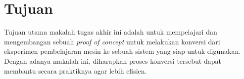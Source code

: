\section{Tujuan}

Tujuan utama makalah tugas akhir ini adalah untuk mempelajari dan mengembangan sebuah \textit{proof of concept} untuk melakukan konversi dari eksperimen pembelajaran mesin ke sebuah sistem yang siap untuk digunakan.
Dengan adanya makalah ini, diharapkan proses konversi tersebut dapat membantu secara praktiknya agar lebih efisien.
